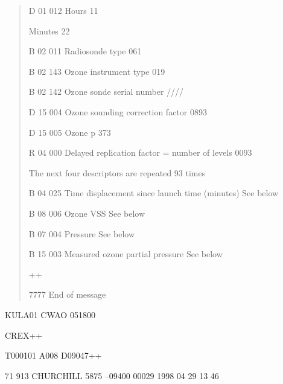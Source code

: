\begin{quote}
D 01 012 Hours 11

Minutes 22

B 02 011 Radiosonde type 061

B 02 143 Ozone instrument type 019

B 02 142 Ozone sonde serial number ////

D 15 004 Ozone sounding correction factor 0893

D 15 005 Ozone p 373

R 04 000 Delayed replication factor = number of levels 0093

The next four descriptors are repeated 93 times

B 04 025 Time displacement since launch time (minutes) See below

B 08 006 Ozone VSS See below

B 07 004 Pressure See below

B 15 003 Measured ozone partial pressure See below

++

7777 End of message
\end{quote}

KULA01 CWAO 051800

CREX++

T000101 A008 D09047++

71 913 CHURCHILL 5875 --09400 00029 1998 04 29 13 46

